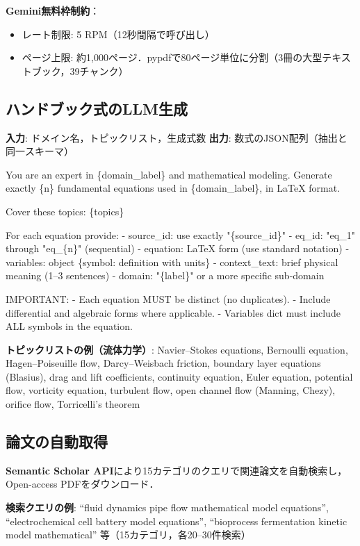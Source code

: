 \documentclass[11pt,a4paper]{ltjsarticle}
\begin{document}
\textbf{Gemini無料枠制約}：
\begin{itemize}[nosep]
  \item レート制限: 5 RPM（12秒間隔で呼び出し）
  \item ページ上限: 約1,000ページ．pypdfで80ページ単位に分割（3冊の大型テキストブック，39チャンク）
\end{itemize}

\subsection{ハンドブック式のLLM生成}

\textbf{入力}: ドメイン名，トピックリスト，生成式数 \quad
\textbf{出力}: 数式のJSON配列（抽出と同一スキーマ）

\begin{promptbox}
You are an expert in \{domain\_label\} and mathematical modeling.
Generate exactly \{n\} fundamental equations used in \{domain\_label\},
in LaTeX format.

Cover these topics: \{topics\}

For each equation provide:
- source\_id: use exactly "\{source\_id\}"
- eq\_id: "eq\_1" through "eq\_\{n\}" (sequential)
- equation: LaTeX form (use standard notation)
- variables: object \{symbol: definition with units\}
- context\_text: brief physical meaning (1--3 sentences)
- domain: "\{label\}" or a more specific sub-domain

IMPORTANT:
- Each equation MUST be distinct (no duplicates).
- Include differential and algebraic forms where applicable.
- Variables dict must include ALL symbols in the equation.
\end{promptbox}

\textbf{トピックリストの例（流体力学）}: Navier--Stokes equations, Bernoulli equation, Hagen--Poiseuille flow, Darcy--Weisbach friction, boundary layer equations (Blasius), drag and lift coefficients, continuity equation, Euler equation, potential flow, vorticity equation, turbulent flow, open channel flow (Manning, Chezy), orifice flow, Torricelli's theorem

\subsection{論文の自動取得}

\textbf{Semantic Scholar API}により15カテゴリのクエリで関連論文を自動検索し，Open-access PDFをダウンロード．

\textbf{検索クエリの例}: ``fluid dynamics pipe flow mathematical model equations'', ``electrochemical cell battery model equations'', ``bioprocess fermentation kinetic model mathematical'' 等（15カテゴリ，各20--30件検索）
\end{document}
